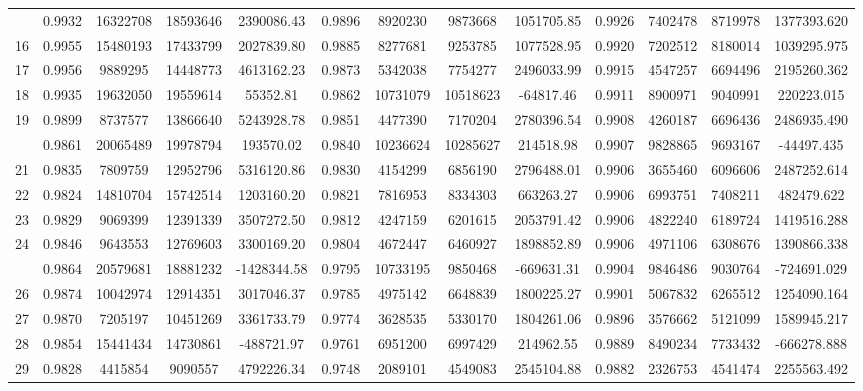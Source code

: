 \documentclass[
  12pt,
]{article}
\begin{document}
\begin{longtable}[t]{lcccccccccccc}
\addlinespace
15 & 0.9932 & 16322708 & 18593646 & 2390086.43 & 0.9896 & 8920230 & 9873668 & 1051705.85 & 0.9926 & 7402478 & 8719978 & 1377393.620\\
16 & 0.9955 & 15480193 & 17433799 & 2027839.80 & 0.9885 & 8277681 & 9253785 & 1077528.95 & 0.9920 & 7202512 & 8180014 & 1039295.975\\
17 & 0.9956 & 9889295 & 14448773 & 4613162.23 & 0.9873 & 5342038 & 7754277 & 2496033.99 & 0.9915 & 4547257 & 6694496 & 2195260.362\\
18 & 0.9935 & 19632050 & 19559614 & 55352.81 & 0.9862 & 10731079 & 10518623 & -64817.46 & 0.9911 & 8900971 & 9040991 & 220223.015\\
19 & 0.9899 & 8737577 & 13866640 & 5243928.78 & 0.9851 & 4477390 & 7170204 & 2780396.54 & 0.9908 & 4260187 & 6696436 & 2486935.490\\
\addlinespace
20 & 0.9861 & 20065489 & 19978794 & 193570.02 & 0.9840 & 10236624 & 10285627 & 214518.98 & 0.9907 & 9828865 & 9693167 & -44497.435\\
21 & 0.9835 & 7809759 & 12952796 & 5316120.86 & 0.9830 & 4154299 & 6856190 & 2796488.01 & 0.9906 & 3655460 & 6096606 & 2487252.614\\
22 & 0.9824 & 14810704 & 15742514 & 1203160.20 & 0.9821 & 7816953 & 8334303 & 663263.27 & 0.9906 & 6993751 & 7408211 & 482479.622\\
23 & 0.9829 & 9069399 & 12391339 & 3507272.50 & 0.9812 & 4247159 & 6201615 & 2053791.42 & 0.9906 & 4822240 & 6189724 & 1419516.288\\
24 & 0.9846 & 9643553 & 12769603 & 3300169.20 & 0.9804 & 4672447 & 6460927 & 1898852.89 & 0.9906 & 4971106 & 6308676 & 1390866.338\\
\addlinespace
25 & 0.9864 & 20579681 & 18881232 & -1428344.58 & 0.9795 & 10733195 & 9850468 & -669631.31 & 0.9904 & 9846486 & 9030764 & -724691.029\\
26 & 0.9874 & 10042974 & 12914351 & 3017046.37 & 0.9785 & 4975142 & 6648839 & 1800225.27 & 0.9901 & 5067832 & 6265512 & 1254090.164\\
27 & 0.9870 & 7205197 & 10451269 & 3361733.79 & 0.9774 & 3628535 & 5330170 & 1804261.06 & 0.9896 & 3576662 & 5121099 & 1589945.217\\
28 & 0.9854 & 15441434 & 14730861 & -488721.97 & 0.9761 & 6951200 & 6997429 & 214962.55 & 0.9889 & 8490234 & 7733432 & -666278.888\\
29 & 0.9828 & 4415854 & 9090557 & 4792226.34 & 0.9748 & 2089101 & 4549083 & 2545104.88 & 0.9882 & 2326753 & 4541474 & 2255563.492\\

\end{longtable}
\end{document}
